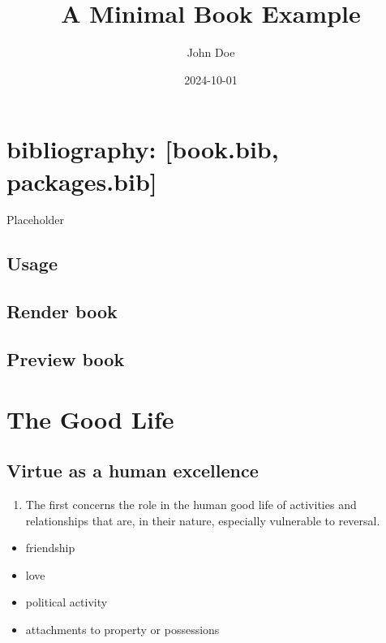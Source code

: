 \documentclass[
]{book}
\title{A Minimal Book Example}
\author{John Doe}
\date{2024-10-01}
\providecommand{\tightlist}{%
  \setlength{\itemsep}{0pt}\setlength{\parskip}{0pt}}
\begin{document}
\maketitle

{
\setcounter{tocdepth}{1}
\tableofcontents
}
\chapter{bibliography: {[}book.bib, packages.bib{]}}\label{bibliography-book.bib-packages.bib}

Placeholder

\section{Usage}\label{usage}

\section{Render book}\label{render-book}

\section{Preview book}\label{preview-book}

\chapter{The Good Life}\label{the-good-life}

\section{Virtue as a human excellence}\label{virtue-as-a-human-excellence}

\begin{enumerate}
\def\labelenumi{\arabic{enumi}.}
\tightlist
\item
  The first concerns the role in the human good life of activities and relationships that are, in their nature, especially vulnerable to reversal.
\end{enumerate}

\begin{itemize}
\tightlist
\item
  friendship
\item
  love
\item
  political activity
\item
  attachments to property or possessions
\end{itemize}
\end{document}
